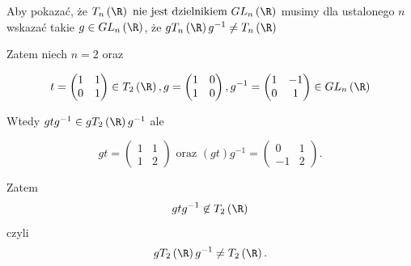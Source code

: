 \begin{solution}
	
	Aby pokazać, że $T_{n}\left( \R \right) \text{ nie jest dzielnikiem } GL_{n}\left( \R \right)$ musimy dla ustalonego $n$ wskazać takie $g\in GL_{n}\left( \R \right)$, że $gT_{n}\left( \R \right)g^{-1} \neq T_{n}\left( \R \right) $

	Zatem niech $n = 2$ oraz 
	
	\[t = \begin{pmatrix} 1 & 1\\0 & 1\end{pmatrix} \in T_{2}	\left( \R \right), g = \begin{pmatrix} 1 & 0\\ 1 & 0 \end{pmatrix},g^{-1} = \begin{pmatrix} 1 & -1 \\ 0 & 1 \end{pmatrix} \in GL_{n}\left( \R \right) \] 

	Wtedy $gtg^{-1} \in gT_{2}\left( \R \right)g^{-1}$ ale

		\[gt = \begin{pmatrix} 1 & 1 \\ 1 & 2 \end{pmatrix} 
		\text{ oraz } 
		\left( gt \right)g^{-1} = \begin{pmatrix} 0 & 1 \\ -1 & 2 \end{pmatrix}.\]

		Zatem \[gtg^{-1} \not\in T_{2}\left( \R \right)\] 
		czyli 
		\[gT_{2}\left( \R \right) g^{-1} \neq T_{2}\left( \R \right) .\]


\end{solution}

